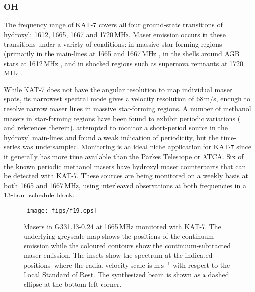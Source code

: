 \subsubsection{OH}

\noindent 
The frequency range of KAT-7 covers all four ground-state transitions
of hydroxyl: 1612, 1665, 1667 and 1720\,MHz.  Maser emission occurs in
these transitions under a variety of conditions: in massive
star-forming regions (primarily in the main-lines at 1665 and
1667\,MHz \citep{caswell98}, in the shells around AGB stars at
1612\,MHz \citep{sevenster}, and in shocked regions such as supernova
remnants at 1720\,MHz \citep{wardle}.

While KAT-7 does not have the angular resolution to map individual
maser spots, its narrowest spectral mode gives a velocity resolution
of 68\,m/s, enough to resolve narrow maser lines in massive
star-forming regions.  A number of methanol masers in star-forming
regions have been found to exhibit periodic variations
(\citealt{goedhart} and references therein). \citet{green} attempted
to monitor a short-period source in the hydroxyl main-lines and found
a weak indication of periodicity, but the time-series was
undersampled. Monitoring is an ideal niche application for KAT-7 since
it generally has more time available than the Parkes Telescope or
ATCA\@. Six of the known periodic methanol masers have hydroxyl maser
counterparts that can be detected with KAT-7. These sources are
being monitored on a weekly basis at both 1665 and 1667\,MHz, using
interleaved observations at both frequencies in a 13-hour schedule
block.

\begin{figure*}
\texttt{[image: figs/f19.eps]}
\caption{Masers in \mbox{G331.13-0.24} at 1665\,MHz monitored with KAT-7. The
  underlying greyscale map shows the positions of the continuum
  emission while the coloured contours show the continuum-subtracted
  maser emission. The insets show the spectrum at the indicated
  positions, where the radial velocity scale is $\mathrm{m \, s^{-1}}$ with
  respect to
  the Local Standard of Rest. The synthesized beam is shown as a
  dashed ellipse at the bottom left corner.}
\label{fig:masers}
\end{figure*}

